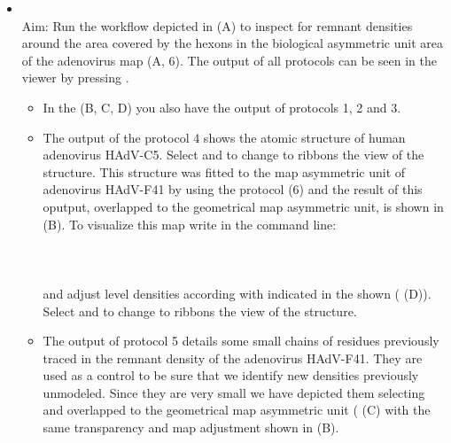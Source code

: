 \begin{itemize}
                \item {}\\
                Aim: Run the \scipion workflow depicted in  (A) to inspect for remnant densities around the area covered by the hexons in the biological asymmetric unit area of the adenovirus map (A, 6). The output of all protocols can be seen in the \chimera viewer by pressing . 
                \begin{itemize}
                        \item In the  (B, C, D) you also have the output of protocols 1, 2 and 3. 
                        \item The output of the protocol 4 shows the atomic structure of human adenovirus HAdV-C5. Select  and  to change to ribbons the view of the structure. This structure was fitted to the map asymmetric unit of adenovirus HAdV-F41 by using the protocol  (6) and the result of this oputput, overlapped to the geometrical map asymmetric unit, is shown in (B). To visualize this map write in the \chimera command line:\\
                        \\
                        \\
                        \\
                        and adjust level densities according with indicated in the shown  ( (D)). Select  and  to change to ribbons the view of the structure.
                        \item The output of protocol 5 details some small chains of  residues previously traced in the remnant density of the adenovirus HAdV-F41. They are used as a control to be sure that we identify new densities previously unmodeled. Since they are very small we have depicted them selecting  and overlapped to the geometrical map asymmetric unit ( (C) with the same transparency and map adjustment shown in (B).

\end{itemize}
\end{itemize}
